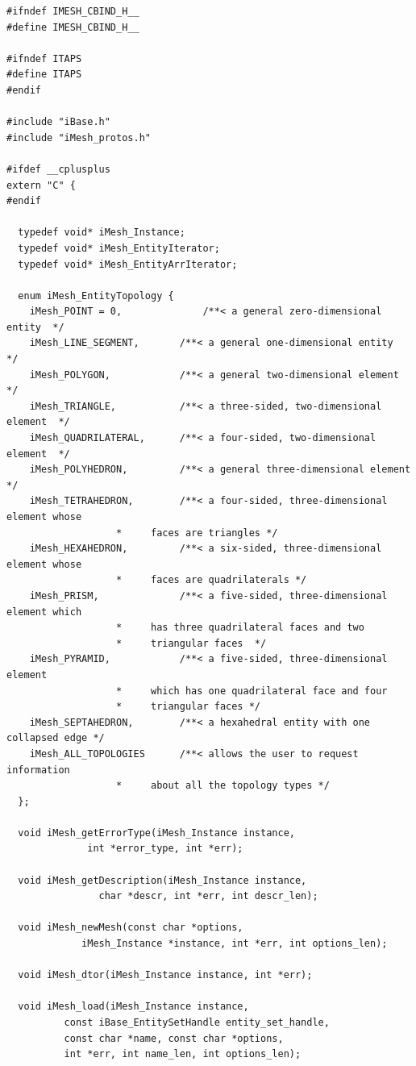 \documentclass{article}
\begin{document}
\begin{small}
\begin{verbatim}
#ifndef IMESH_CBIND_H__
#define IMESH_CBIND_H__

#ifndef ITAPS
#define ITAPS
#endif

#include "iBase.h"
#include "iMesh_protos.h"

#ifdef __cplusplus
extern "C" {
#endif

  typedef void* iMesh_Instance;
  typedef void* iMesh_EntityIterator;
  typedef void* iMesh_EntityArrIterator;

  enum iMesh_EntityTopology {
    iMesh_POINT = 0,              /**< a general zero-dimensional entity  */
    iMesh_LINE_SEGMENT,       /**< a general one-dimensional entity  */
    iMesh_POLYGON,            /**< a general two-dimensional element  */
    iMesh_TRIANGLE,           /**< a three-sided, two-dimensional element  */
    iMesh_QUADRILATERAL,      /**< a four-sided, two-dimensional element  */
    iMesh_POLYHEDRON,         /**< a general three-dimensional element */
    iMesh_TETRAHEDRON,        /**< a four-sided, three-dimensional element whose
			       *     faces are triangles */
    iMesh_HEXAHEDRON,         /**< a six-sided, three-dimensional element whose
			       *     faces are quadrilaterals */
    iMesh_PRISM,              /**< a five-sided, three-dimensional element which
			       *     has three quadrilateral faces and two
			       *     triangular faces  */
    iMesh_PYRAMID,            /**< a five-sided, three-dimensional element
			       *     which has one quadrilateral face and four
			       *     triangular faces */
    iMesh_SEPTAHEDRON,        /**< a hexahedral entity with one collapsed edge */
    iMesh_ALL_TOPOLOGIES      /**< allows the user to request information
			       *     about all the topology types */
  };

  void iMesh_getErrorType(iMesh_Instance instance,
			  int *error_type, int *err);

  void iMesh_getDescription(iMesh_Instance instance,
			    char *descr, int *err, int descr_len);

  void iMesh_newMesh(const char *options,
		     iMesh_Instance *instance, int *err, int options_len);

  void iMesh_dtor(iMesh_Instance instance, int *err);

  void iMesh_load(iMesh_Instance instance,
		  const iBase_EntitySetHandle entity_set_handle,
		  const char *name, const char *options,
		  int *err, int name_len, int options_len);


\end{verbatim}
\end{small}
\end{document}
